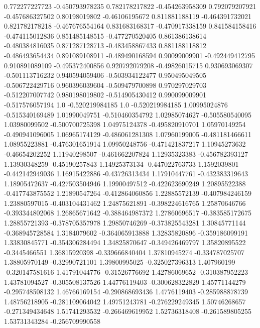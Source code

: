  0.772277227723  -0.450793978235
 0.782178217822  -0.454263958309
 0.792079207921  -0.457686327502
  0.80198019802   -0.46106195672
 0.811881188119  -0.464391732021
 0.821782178218  -0.467676554164
 0.831683168317  -0.470917338159
 0.841584158416  -0.474115012836
 0.851485148515  -0.477270520405
 0.861386138614  -0.480384816035
 0.871287128713  -0.483458867433
 0.881188118812  -0.486493654434
 0.891089108911  -0.489490168594
  0.90099009901  -0.492449412795
 0.910891089109  -0.495372400856
 0.920792079208   -0.49826015715
 0.930693069307  -0.501113716232
 0.940594059406  -0.503934122477
 0.950495049505  -0.506722429716
 0.960396039604  -0.509479700898
 0.970297029703  -0.512207007742
 0.980198019802  -0.514905430412
 0.990099009901  -0.517576057194
            1.0  -0.520219984185
            1.0  -0.520219984185
  1.00995024876  -0.515340169489
  1.01990049751  -0.510460354792
  1.02985074627  -0.505580540095
  1.03980099502  -0.500700725398
  1.04975124378  -0.495820910701
  1.05970149254  -0.490941096005
  1.06965174129  -0.486061281308
  1.07960199005  -0.481181466611
  1.08955223881  -0.476301651914
  1.09950248756  -0.471421837217
  1.10945273632   -0.46654202252
  1.11940298507  -0.461662207824
  1.12935323383  -0.456782393127
  1.13930348259   -0.45190257843
  1.14925373134  -0.447022763733
   1.1592039801  -0.442142949036
  1.16915422886   -0.43726313434
  1.17910447761  -0.432383319643
  1.18905472637  -0.427503504946
  1.19900497512  -0.422623690249
  1.20895522388  -0.417743875552
  1.21890547264  -0.412864060856
  1.22885572139  -0.407984246159
  1.23880597015  -0.403104431462
  1.24875621891  -0.398224616765
  1.25870646766  -0.393344802068
  1.26865671642  -0.388464987372
  1.27860696517  -0.383585172675
  1.28855721393  -0.378705357978
  1.29850746269  -0.373825543281
  1.30845771144  -0.368945728584
   1.3184079602  -0.364065913888
  1.32835820896  -0.359186099191
  1.33830845771  -0.354306284494
  1.34825870647  -0.349426469797
  1.35820895522    -0.3445466551
  1.36815920398  -0.339666840404
  1.37810945274  -0.334787025707
  1.38805970149   -0.32990721101
  1.39800995025  -0.325027396313
    1.407960199  -0.320147581616
  1.41791044776   -0.31526776692
  1.42786069652  -0.310387952223
  1.43781094527  -0.305508137526
  1.44776119403  -0.300628322829
  1.45771144279  -0.295748508132
  1.46766169154  -0.290868693436
   1.4776119403  -0.285988878739
  1.48756218905  -0.281109064042
  1.49751243781  -0.276229249345
  1.50746268657  -0.271349434648
  1.51741293532  -0.266469619952
  1.52736318408  -0.261589805255
  1.53731343284  -0.256709990558
